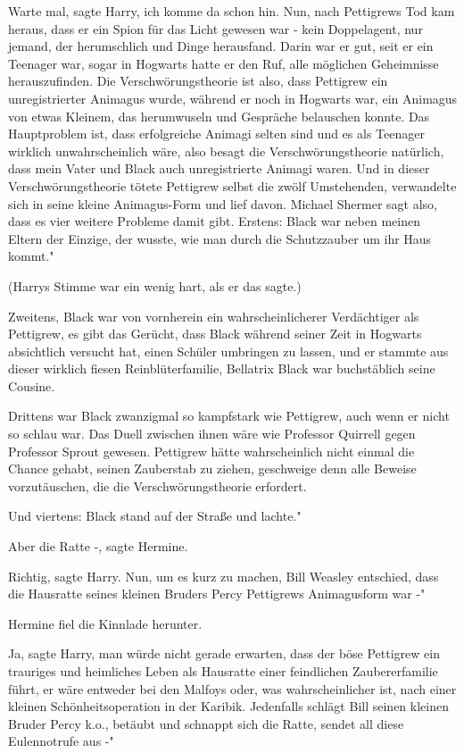 \glqq Warte mal\grqq{}, sagte Harry, \glqq ich komme da schon hin. Nun, nach
Pettigrews Tod kam heraus, dass er ein Spion für das Licht gewesen war - kein
Doppelagent, nur jemand, der herumschlich und Dinge herausfand. Darin war er
gut, seit er ein Teenager war, sogar in Hogwarts hatte er den Ruf, alle
möglichen Geheimnisse herauszufinden. Die Verschwörungstheorie ist also, dass
Pettigrew ein unregistrierter Animagus wurde, während er noch in Hogwarts war,
ein Animagus von etwas Kleinem, das herumwuseln und Gespräche belauschen konnte.
Das Hauptproblem ist, dass erfolgreiche Animagi selten sind und es als Teenager
wirklich unwahrscheinlich wäre, also besagt die Verschwörungstheorie natürlich,
dass mein Vater und Black auch unregistrierte Animagi waren. Und in dieser
Verschwörungstheorie tötete Pettigrew selbst die zwölf Umstehenden, verwandelte
sich in seine kleine Animagus-Form und lief davon. Michael Shermer sagt also,
dass es vier weitere Probleme damit gibt. Erstens: Black war neben meinen Eltern
der Einzige, der wusste, wie man durch die Schutzzauber um ihr Haus kommt."

(Harrys Stimme war ein wenig hart, als er das sagte.)

\glqq Zweitens, Black war von vornherein ein wahrscheinlicherer Verdächtiger als
Pettigrew, es gibt das Gerücht, dass Black während seiner Zeit in Hogwarts
absichtlich versucht hat, einen Schüler umbringen zu lassen, und er stammte aus
dieser wirklich fiesen Reinblüterfamilie, Bellatrix Black war buchstäblich seine
Cousine.

Drittens war Black zwanzigmal so kampfstark wie Pettigrew, auch wenn er nicht so
schlau war. Das Duell zwischen ihnen wäre wie Professor Quirrell gegen Professor
Sprout gewesen. Pettigrew hätte wahrscheinlich nicht einmal die Chance gehabt,
seinen Zauberstab zu ziehen, geschweige denn alle Beweise vorzutäuschen, die die
Verschwörungstheorie erfordert.

Und viertens: Black stand auf der Straße und lachte."

\glqq Aber die Ratte -\grqq{}, sagte Hermine.

\glqq Richtig\grqq{}, sagte Harry. \glqq Nun, um es kurz zu machen, Bill Weasley
entschied, dass die Hausratte seines kleinen Bruders Percy Pettigrews
Animagusform war -"

Hermine fiel die Kinnlade herunter.

\glqq Ja\grqq{}, sagte Harry, \glqq man würde nicht gerade erwarten, dass der
böse Pettigrew ein trauriges und heimliches Leben als Hausratte einer
feindlichen Zaubererfamilie führt, er wäre entweder bei den Malfoys oder, was
wahrscheinlicher ist, nach einer kleinen Schönheitsoperation in der Karibik.
Jedenfalls schlägt Bill seinen kleinen Bruder Percy k.o., betäubt und schnappt
sich die Ratte, sendet all diese Eulennotrufe aus -"


